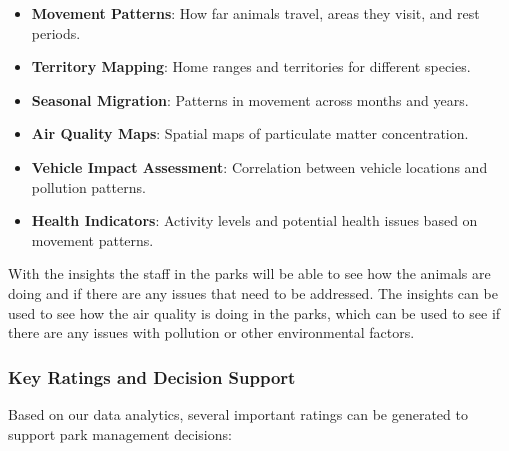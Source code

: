 \begin{itemize}
  \item \textbf{Movement Patterns}: How far animals travel, areas they visit, and rest periods.
  \item \textbf{Territory Mapping}: Home ranges and territories for different species.
  \item \textbf{Seasonal Migration}: Patterns in movement across months and years.
  \item \textbf{Air Quality Maps}: Spatial maps of particulate matter concentration.
  \item \textbf{Vehicle Impact Assessment}: Correlation between vehicle locations and pollution patterns.
  \item \textbf{Health Indicators}: Activity levels and potential health issues based on movement patterns.
\end{itemize}

With the insights the staff in the parks will be able to see how the animals are doing and if there are any issues that need to be addressed. The insights can be used to see how the air quality is doing in the parks, which can be used to see if there are any issues with pollution or other environmental factors.

\subsubsection{Key Ratings and Decision Support}
Based on our data analytics, several important ratings can be generated to support park management decisions:


